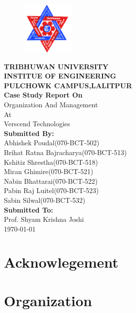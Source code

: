 \documentclass[12pt, a4paper]{article}
\begin{document}
	\begin{titlepage}
	\centering
	\begin{figure}[h!]
	\centering
	\includegraphics[width=100px]{fig/tu-logo.jpg}
	\end{figure}
	\vspace{10mm}
	{\large\textbf{TRIBHUWAN UNIVERSITY\\
	INSTITUE OF ENGINEERING\\
	PULCHOWK CAMPUS,LALITPUR\\}}
	\vspace{10mm}
	\textbf{ Case Study Report On}\\
	Organization And Management\\
	At\\
	Verscend Technologies\\
	\vspace{10mm}
	\textbf{Submitted By:}\\
	Abhishek Poudal(070-BCT-502)\\
	Brihat Ratna Bajracharya(070-BCT-513)\\
	Kshitiz Shrestha(070-BCT-518)\\
	Miran Ghimire(070-BCT-521)\\
	Nabin Bhattarai(070-BCT-522)\\
	Pabin Raj Luitel(070-BCT-523)\\
	Sabin Silwal(070-BCT-532)\\
	\vspace{10mm}
	\textbf{Submitted To:}\\
	Prof. Shyam Krishna Joshi\\
	\vspace{10mm}
	\vfill
	\today
	\end{titlepage}
	\cleardoublepage

	\section*{Acknowlegement}
	\cleardoublepage

	\section{Organization}
\end{document}
